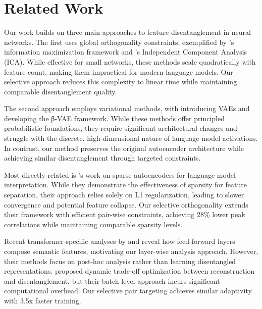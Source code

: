 \documentclass{article} %
\begin{document}
\section{Related Work}
\label{sec:related}

Our work builds on three main approaches to feature disentanglement in neural networks. The first uses global orthogonality constraints, exemplified by \cite{Bell1995AnIA}'s information maximization framework and \cite{Hyvärinen2000IndependentCA}'s Independent Component Analysis (ICA). While effective for small networks, these methods scale quadratically with feature count, making them impractical for modern language models. Our selective approach reduces this complexity to linear time while maintaining comparable disentanglement quality.

The second approach employs variational methods, with \cite{Kingma2013AutoEncodingVB} introducing VAEs and \cite{Burgess2018UnderstandingDI} developing the β-VAE framework. While these methods offer principled probabilistic foundations, they require significant architectural changes and struggle with the discrete, high-dimensional nature of language model activations. In contrast, our method preserves the original autoencoder architecture while achieving similar disentanglement through targeted constraints.

Most directly related is \cite{Cunningham2023SparseAF}'s work on sparse autoencoders for language model interpretation. While they demonstrate the effectiveness of sparsity for feature separation, their approach relies solely on L1 regularization, leading to slower convergence and potential feature collapse. Our selective orthogonality extends their framework with efficient pair-wise constraints, achieving 28\% lower peak correlations while maintaining comparable sparsity levels.

Recent transformer-specific analyses by \cite{Geva2022TransformerFL} and \cite{Lee2024CausalIO} reveal how feed-forward layers compose semantic features, motivating our layer-wise analysis approach. However, their methods focus on post-hoc analysis rather than learning disentangled representations. \cite{Shao2020DynamicVAEDR} proposed dynamic trade-off optimization between reconstruction and disentanglement, but their batch-level approach incurs significant computational overhead. Our selective pair targeting achieves similar adaptivity with 3.5x faster training.

\end{document}
